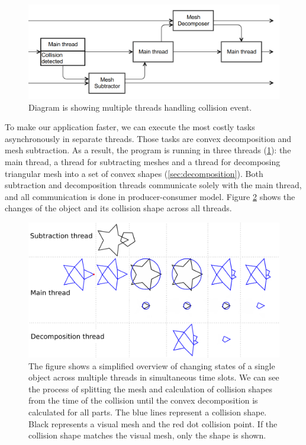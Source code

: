 \begin{figure}
        \centering
        \includegraphics[width=\textwidth]{img/decompositionFlow}
        \caption{Diagram is showing multiple threads handling collision event. }
        \label{fig:threads}
\end{figure}
To make our application faster, we can execute the most costly tasks asynchronously in separate threads. Those tasks are convex decomposition and mesh subtraction. As a result, the program is running in three threads (\cref{fig:threads}): the main thread, a thread for subtracting meshes and a thread for decomposing triangular mesh into a set of convex shapes (\cref{sec:decomposition}). Both subtraction and decomposition threads communicate solely with the main thread, and all communication is done in producer-consumer model. Figure \ref{fig:objectInThreads} shows the changes of the object and its collision shape across all threads.

\begin{figure}
        \centering
        \includegraphics[width=\textwidth]{img/object-progress}
        \caption{The figure shows a simplified overview of changing states of a single object across multiple threads in simultaneous time slots. We can see the process of splitting the mesh and calculation of collision shapes from the time of the collision until the convex decomposition is calculated for all parts. The blue lines represent a collision shape. Black represents a visual mesh and the red dot collision point. If the collision shape matches the visual mesh, only the shape is shown. }
        \label{fig:objectInThreads}
\end{figure}

